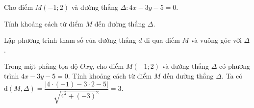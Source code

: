 \begin{bt}%
		Cho điểm $M(-1;2)$ và đường thẳng $\Delta\colon 4x-3y-5=0$.
		\begin{listEX}
			\item Tính khoảng cách từ điểm $M$ đến đường thẳng $\Delta$.
			\item Lập phương trình tham số của đường thẳng $d$ đi qua điểm $M$ và vuông góc với $\Delta$.
		\end{listEX}
	\end{bt}

\begin{bt}%
	Trong mặt phẳng tọa độ $Oxy$, cho điểm $M(-1;2)$ và đường thẳng $\Delta$ có phương trình $4x-3y-5=0$. Tính khoảng cách từ điểm $M$ đến đường thẳng $\Delta$.
	\loigiai
	{
		Ta có $\mathrm{d}(M,\Delta)=\dfrac{|4\cdot(-1)-3\cdot 2-5|}{\sqrt{4^2+(-3)^2}}=3$.
	}
\end{bt}

